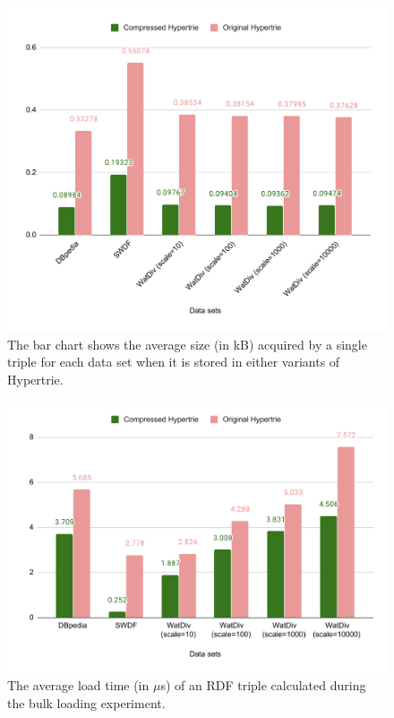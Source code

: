 \begin{figure}
	\centering
	\includegraphics[width=\textwidth]{figures/chapter5/size}
	\caption{The bar chart shows the average size (in kB) acquired by a single triple for each data set when it is stored in either variants of Hypertrie.}
	\label{fig:eval_size}
\end{figure}

\begin{figure}
	\centering
	\includegraphics[width=\textwidth]{figures/chapter5/loadspeed}
	\caption{The average load time (in $\mu $s) of an RDF triple calculated during the bulk loading experiment.}
	\label{fig:eval_speed}
\end{figure}
\clearpage

